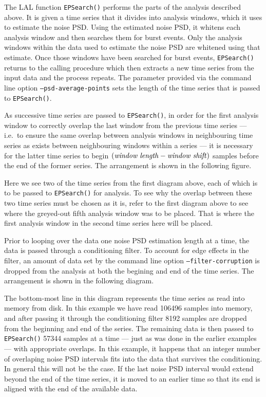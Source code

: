 \documentclass[10pt]{article}
\newcommand{\function}[1]{\texttt{#1}}
\newcommand{\option}[1]{\texttt{#1}}
\newcommand{\parm}[1]{\textit{#1}}
\begin{document}
The LAL function \function{EPSearch()} performs the parts of the analysis
described above.  It is given a time series that it divides into analysis
windows, which it uses to estimate the noise PSD.  Using the estimated
noise PSD, it whitens each analysis window and then searches them for burst
events.  Only the analysis windows within the data used to estimate the
noise PSD are whitened using that estimate.  Once those windows have been
searched for burst events, \function{EPSearch()} returns to the calling
procedure which then extracts a new time series from the input data and the
process repeats.  The parameter provided via the command line option
\option{--psd-average-points} sets the length of the time series that is
passed to \function{EPSearch()}.

As successive time series are passed to \function{EPSearch()}, in order for
the first analysis window to correctly overlap the last window from the
previous time series --- i.e.\ to ensure the same overlap between analysis
windows in neighbouring time series as exists between neighbouring windows
within a series --- it is necessary for the latter time series to begin
$(\mbox{\parm{window length}} - \mbox{\parm{window shift}})$ samples before
the end of the former series.  The arrangement is shown in the following
figure.
\begin{center}

\end{center}
Here we see two of the time series from the first diagram above, each of
which is to be passed to \function{EPSearch()} for analysis.  To see why
the overlap between these two time series must be chosen as it is, refer to
the first diagram above to see where the greyed-out fifth analysis window
was to be placed.  That is where the first analysis window in the second
time series here will be placed.

Prior to looping over the data one noise PSD estimation length at a time,
the data is passed through a conditioning filter.  To account for edge
effects in the filter, an amount of data set by the command line option
\option{--filter-corruption} is dropped from the analysis at both the
begining and end of the time series.  The arrangement is shown in the
following diagram.
\begin{center}

\end{center}
The bottom-most line in this diagram represents the time series as read
into memory from disk.  In this example we have read 106496 samples into
memory, and after passing it through the conditioning filter 8192 samples
are dropped from the beginning and end of the series.  The remaining data
is then passed to \function{EPSearch()} 57344 samples at a time --- just as
was done in the earlier examples --- with appropriate overlaps.  In this
example, it happens that an integer number of overlaping noise PSD
intervals fits into the data that survives the conditioning.  In general
this will not be the case.  If the last noise PSD interval would extend
beyond the end of the time series, it is moved to an earlier time so that
its end is aligned with the end of the available data.
\end{document}

